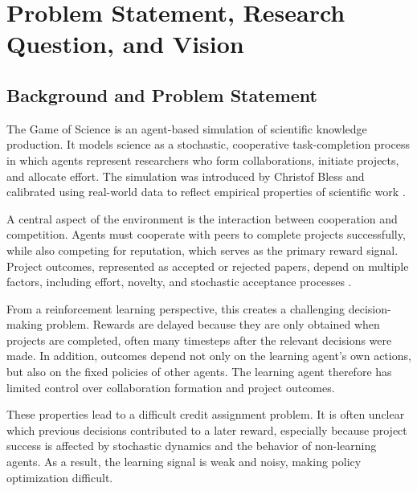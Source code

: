 \documentclass[english,bachelor]{hsluthesis}
\begin{document}
\mainmatter

\chapter{Problem Statement, Research Question, and Vision}

\section{Background and Problem Statement}

The Game of Science is an agent-based simulation of scientific knowledge production. It models science as a stochastic, cooperative task-completion process in which agents represent researchers who form collaborations, initiate projects, and allocate effort. The simulation was introduced by Christof Bless and calibrated using real-world data to reflect empirical properties of scientific work \cite{bless_game_of_science_2026}.

A central aspect of the environment is the interaction between cooperation and competition. Agents must cooperate with peers to complete projects successfully, while also competing for reputation, which serves as the primary reward signal. Project outcomes, represented as accepted or rejected papers, depend on multiple factors, including effort, novelty, and stochastic acceptance processes \cite{bless_game_of_science_2026}.

From a reinforcement learning perspective, this creates a challenging decision-making problem. Rewards are delayed because they are only obtained when projects are completed, often many timesteps after the relevant decisions were made. In addition, outcomes depend not only on the learning agent's own actions, but also on the fixed policies of other agents. The learning agent therefore has limited control over collaboration formation and project outcomes.

These properties lead to a difficult credit assignment problem. It is often unclear which previous decisions contributed to a later reward, especially because project success is affected by stochastic dynamics and the behavior of non-learning agents. As a result, the learning signal is weak and noisy, making policy optimization difficult.
\end{document}
